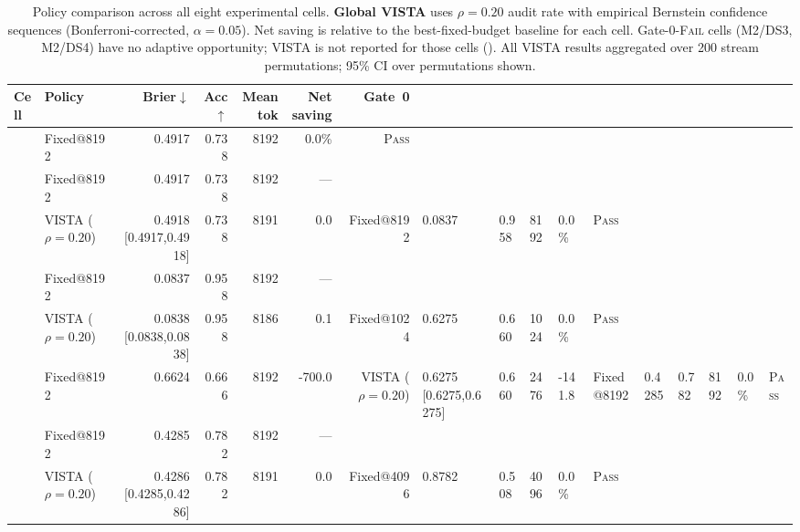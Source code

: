 \begin{table}[t]
\centering
\caption{%
  Policy comparison across all eight experimental cells.
  \textbf{Global VISTA} uses $\rho=0.20$ audit rate with empirical Bernstein
  confidence sequences (Bonferroni-corrected, $\alpha=0.05$).
  Net saving is relative to the best-fixed-budget baseline for each cell.
  Gate-0-\textsc{Fail} cells (M2/DS3, M2/DS4) have no adaptive opportunity;
  VISTA is not reported for those cells (\textemdash).
  All VISTA results aggregated over 200 stream permutations; 95\% CI over permutations shown.
}
\label{tab:vista-main-policy}
\small
\begin{tabular}{@{}llrrrrr@{}}
\toprule
Cell & Policy & Brier$\downarrow$ & Acc$\uparrow$ & Mean tok & Net saving & Gate~0 \\
\midrule
{} & Fixed@8192 & 0.4917 & 0.738 & 8192 & 0.0\% & \textsc{Pass} \\
 & Fixed@8192 & 0.4917 & 0.738 & 8192 & --- & \\
 & VISTA ($\rho=0.20$) & 0.4918 [0.4917,0.4918] & 0.738 & 8191 & 0.0%
\midrule
{} & Fixed@8192 & 0.0837 & 0.958 & 8192 & 0.0\% & \textsc{Pass} \\
 & Fixed@8192 & 0.0837 & 0.958 & 8192 & --- & \\
 & VISTA ($\rho=0.20$) & 0.0838 [0.0838,0.0838] & 0.958 & 8186 & 0.1%
\midrule
{} & Fixed@1024 & 0.6275 & 0.660 & 1024 & 0.0\% & \textsc{Pass} \\
 & Fixed@8192 & 0.6624 & 0.666 & 8192 & -700.0%
 & VISTA ($\rho=0.20$) & 0.6275 [0.6275,0.6275] & 0.660 & 2476 & -141.8%
\midrule
{} & Fixed@8192 & 0.4285 & 0.782 & 8192 & 0.0\% & \textsc{Pass} \\
 & Fixed@8192 & 0.4285 & 0.782 & 8192 & --- & \\
 & VISTA ($\rho=0.20$) & 0.4286 [0.4285,0.4286] & 0.782 & 8191 & 0.0%
\midrule
{} & Fixed@4096 & 0.8782 & 0.508 & 4096 & 0.0\% & \textsc{Pass} \\

\end{tabular}
\end{table}
